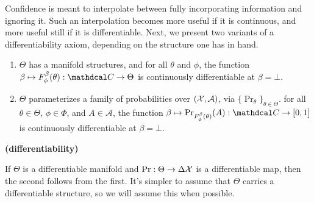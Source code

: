 
Confidence is meant to interpolate between fully incorporating information and ignoring it.
Such an interpolation becomes more useful if it is continuous, and more useful still if it is differentiable.
Next, we present two variants of a differentiability axiom, depending on the structure one has in hand. 

\begin{CFaxioms}
	\item \label{ax:diffble}
	\begin{enumerate}
	\item $\Theta$ has a manifold structures, and
		for all $\theta$ and $\phi$, the function $\beta \mapsto F^{\beta}_\phi(\theta) : \confdom \to \Theta$
		is continuously differentiable at $\beta = \bot$. %
	\item 
		$\Theta$ parameterizes a family of probabilities over $(\mathcal X, \mathcal A)$,
		via $\{ \Pr_\theta \}_{\theta \in \Theta}$.
		for all $\theta \in \Theta$, $\phi \in \Phi$, and  $A \in \mathcal A$,
		the function $\beta \mapsto \Pr_{F^{\beta}_\phi(\theta)}(A)
		: \confdom \to \mathbb [0,1]$ is
		continuously differentiable at $\beta=\bot$. 
			\label{ax:diffble2}
	\end{enumerate}
	\hfill \textbf{(differentiability)}
\end{CFaxioms}


If $\Theta$ is a differentiable manifold and $\Pr: \Theta \to \Delta\mathcal X$ is a differentiable map, then the second follows from the first. 
It's simpler to assume that $\Theta$ carries a differentiable structure, so we will assume this when possible.

